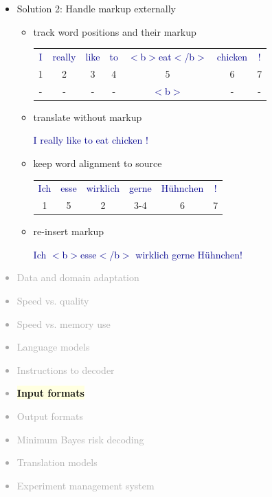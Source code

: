 \documentclass[landscape]{uedslides2C}
\newcommand{\example}[1]{\textcolor{darkblue}{\rm #1}}
\newcommand{\currenttopic}[1]{\colorbox{lightyellow}{\textcolor{black}{\bf #1}}}
\begin{document}
\begin{itemize}
\item Solution 2: Handle markup externally
\begin{itemize} \itemsep 5mm
\item track word positions and their markup
\begin{center}
\begin{tabular}{ccccccc}
\example{I} & \example{really} & \example{like} & \example{to} & \example{$<$b$>$eat$<$/b$>$} & \example{chicken} & \example{!} \\
1 & 2 & 3 & 4 & 5 & 6 & 7\\
-&-&-&-&\example{$<$b$>$}&-&-\\
\end{tabular}
\end{center}

\item translate without markup
\begin{center}
\example{I really like to eat chicken !}
\end{center}

\item keep word alignment to source
\begin{center}
\begin{tabular}{cccccc}
\example{Ich} & \example{esse} & \example{wirklich} & \example{gerne} & \example{H{\"u}hnchen} & \example{!} \\
1 & 5 & 2 & 3-4 & 6 & 7\\
\end{tabular}
\end{center}

\item re-insert markup
\begin{center}
\example{Ich $<$b$>$esse$<$/b$>$ wirklich gerne H{\"u}hnchen!}
\end{center}

\end{itemize}
\end{itemize}


\vspace{-5mm}
\textcolor{darkgrey}{
\begin{itemize} \itemsep -1mm
\item Data and domain adaptation
\item Speed vs. quality
\item Speed vs. memory use
\item Language models
\item Instructions to decoder
\item \currenttopic{Input formats}
\item Output formats
\item Minimum Bayes risk decoding
\item Translation models
\item Experiment management system
\end{itemize}
}
\end{document}
